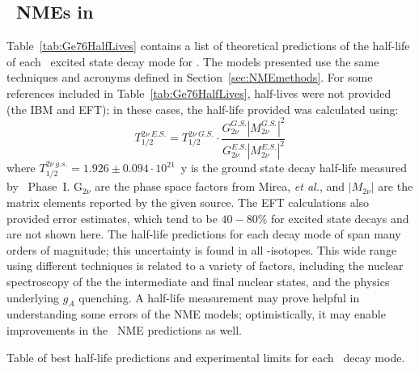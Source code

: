 \documentclass[/main.tex]{subfiles}
\begin{document}
\subsection{\tnbb\ NMEs in } \label{sec:tnbbesnmes}
Table~\ref{tab:Ge76HalfLives} contains a list of theoretical predictions of the half-life of each \tnbb\ excited state decay mode for .
The models presented use the same techniques and acronyms defined in Section~\ref{sec:NMEmethods}.
For some references included in Table~\ref{tab:Ge76HalfLives}, half-lives were not provided (the IBM\cite{barea2013, barea2015} and EFT\cite{menendez2018}); in these cases, the half-life provided was calculated using:
\begin{equation} \label{eq:hlcalc}
  T^{2\nu~E.S.}_{1/2} = T^{2\nu~G.S.}_{1/2}\cdot\frac{G_{2\nu}^{G.S.}|M_{2\nu}^{G.S.}|^2}{G_{2\nu}^{E.S.}|M_{2\nu}^{E.S.}|^2}
\end{equation}
where $T_{1/2}^{2\nu~g.s.}=1.926\pm0.094\cdot10^{21}$~y is the ground state decay half-life measured by \Gerda\ Phase~I.
$\mathrm{G}_{2\nu}$ are the phase space factors from Mirea, \textit{et al.}\cite{mirea2015}, and $|M_{2\nu}|$ are the matrix elements reported by the given source.
The EFT calculations\cite{menendez2018} also provided error estimates, which tend to be $40-80\%$ for excited state decays and are not shown here.
The half-life predictions for each decay mode of  span many orders of magnitude; this uncertainty is found in all \bb-isotopes\cite{barabash2017}.
This wide range using different techniques is related to a variety of factors, including the nuclear spectroscopy of the the intermediate and final nuclear states, and the physics underlying $g_A$ quenching.
A half-life measurement may prove helpful in understanding some errors of the NME models; optimistically, it may enable improvements in the \znbb\ NME predictions as well.
\begin{table}[p]
  \caption[Current half-live limits and predictions for all \tnbb-decay modes of ]{\label{tab:Ge76HalfLives}
    Table of best half-life predictions and experimental limits for each  \tnbb\ decay mode.}
  
\end{table}
\end{document}
